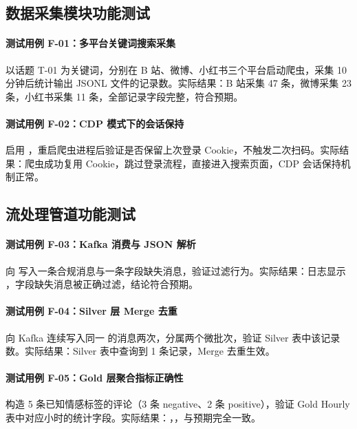 \subsection{数据采集模块功能测试}

\paragraph{测试用例 F-01：多平台关键词搜索采集}
以话题 T-01 为关键词，分别在 B 站、微博、小红书三个平台启动爬虫，采集 10 分钟后统计输出 JSONL 文件的记录数。实际结果：B 站采集 47 条，微博采集 23 条，小红书采集 11 条，全部记录字段完整，符合预期。

\paragraph{测试用例 F-02：CDP 模式下的会话保持}
启用 ，重启爬虫进程后验证是否保留上次登录 Cookie，不触发二次扫码。实际结果：爬虫成功复用 Cookie，跳过登录流程，直接进入搜索页面，CDP 会话保持机制正常。

\subsection{流处理管道功能测试}

\paragraph{测试用例 F-03：Kafka 消费与 JSON 解析}
向  写入一条合规消息与一条字段缺失消息，验证过滤行为。实际结果：日志显示 ，字段缺失消息被正确过滤，结论符合预期。

\paragraph{测试用例 F-04：Silver 层 Merge 去重}
向 Kafka 连续写入同一  的消息两次，分属两个微批次，验证 Silver 表中该记录数。实际结果：Silver 表中查询到 1 条记录，Merge 去重生效。

\paragraph{测试用例 F-05：Gold 层聚合指标正确性}
构造 5 条已知情感标签的评论（3 条 negative、2 条 positive），验证 Gold Hourly 表中对应小时的统计字段。实际结果：，，与预期完全一致。

